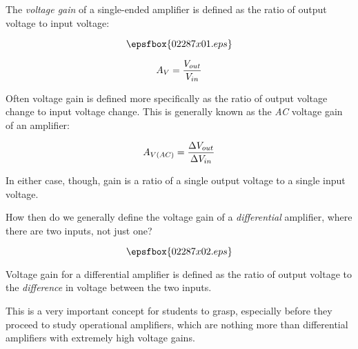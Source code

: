 

The {\it voltage gain} of a single-ended amplifier is defined as the ratio of output voltage to input voltage:

$$\epsfbox{02287x01.eps}$$

$$A_V = {V_{out} \over V_{in}}$$

Often voltage gain is defined more specifically as the ratio of output voltage change to input voltage change.  This is generally known as the {\it AC} voltage gain of an amplifier:

$$A_{V(AC)} = {{\Delta V_{out}} \over {\Delta V_{in}}}$$

In either case, though, gain is a ratio of a single output voltage to a single input voltage.

\vskip 10pt

How then do we generally define the voltage gain of a {\it differential} amplifier, where there are two inputs, not just one?

$$\epsfbox{02287x02.eps}$$







Voltage gain for a differential amplifier is defined as the ratio of output voltage to the {\it difference} in voltage between the two inputs.







This is a very important concept for students to grasp, especially before they proceed to study operational amplifiers, which are nothing more than differential amplifiers with extremely high voltage gains.




